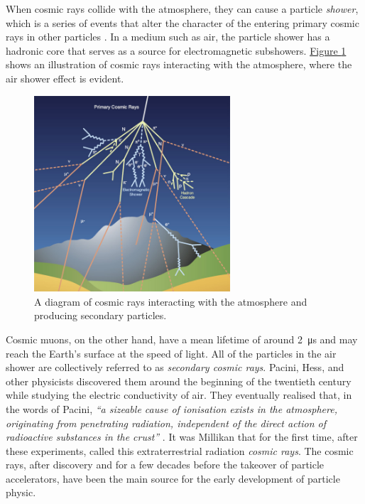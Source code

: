 \par
When cosmic rays collide with the atmosphere, they can cause a particle \textit{shower}, which is a series of events that alter the character of the entering primary cosmic rays in other particles \cite{bonomi_2020_applications}. In a medium such as air, the particle shower has a hadronic core that serves as a source for electromagnetic subshowers. \hyperref[figCosmicRay]{Figure \ref{figCosmicRay}} shows an illustration of cosmic rays interacting with the atmosphere, where the air shower effect is evident.

\begin{figure}[h!]
    \centering
    \includegraphics[width=0.65\textwidth]{Images/chap3/cosmic_ray.jpg}
    \caption{A diagram of cosmic rays interacting with the atmosphere and producing secondary particles. \cite{marzena_2017_cms}}
    \label{figCosmicRay}
\end{figure}

\par
Cosmic muons, on the other hand, have a mean lifetime of around \SI{2}{\micro\second} and may reach the Earth's surface at the speed of light. All of the particles in the air shower are collectively referred to as \textit{secondary cosmic rays}. Pacini, Hess, and other physicists discovered them around the beginning of the twentieth century while studying the electric conductivity of air. They eventually realised that, in the words of Pacini, \textit{``a sizeable cause of ionisation exists in the atmosphere, originating from penetrating radiation, independent of the direct action of radioactive substances in the crust''} \cite{deangelis_2012_domenico, alessandrodeangelis_2012_lenigma}. It was Millikan that for the first time, after these experiments, called this extraterrestrial radiation \textit{cosmic rays}.  The cosmic rays, after discovery and for a few decades before the takeover of particle accelerators, have been the main source for the early development of particle physic.

